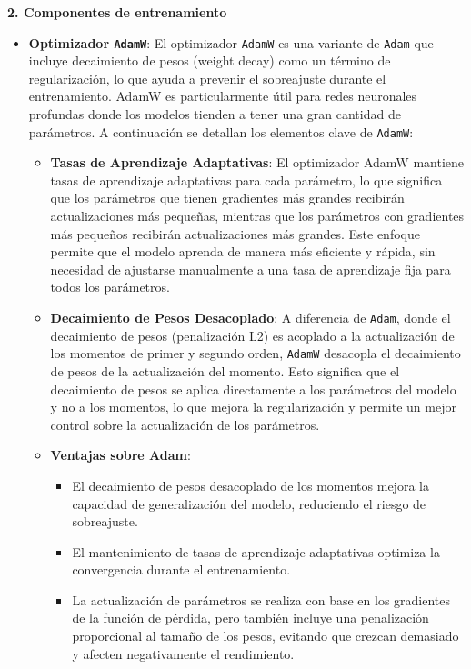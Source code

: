 \textbf{2. Componentes de entrenamiento}
\begin{itemize}
    \item \textbf{Optimizador \texttt{AdamW}}:
    El optimizador \texttt{AdamW} es una variante de \texttt{Adam} que incluye decaimiento de pesos (weight decay) como un término de regularización, lo que ayuda a prevenir el sobreajuste durante el entrenamiento. AdamW es particularmente útil para redes neuronales profundas donde los modelos tienden a tener una gran cantidad de parámetros. A continuación se detallan los elementos clave de \texttt{AdamW}:
    
    \begin{itemize}
        \item \textbf{Tasas de Aprendizaje Adaptativas}: 
        El optimizador AdamW mantiene tasas de aprendizaje adaptativas para cada parámetro, lo que significa que los parámetros que tienen gradientes más grandes recibirán actualizaciones más pequeñas, mientras que los parámetros con gradientes más pequeños recibirán actualizaciones más grandes. Este enfoque permite que el modelo aprenda de manera más eficiente y rápida, sin necesidad de ajustarse manualmente a una tasa de aprendizaje fija para todos los parámetros. 

        \item \textbf{Decaimiento de Pesos Desacoplado}: 
        A diferencia de \texttt{Adam}, donde el decaimiento de pesos (penalización L2) es acoplado a la actualización de los momentos de primer y segundo orden, \texttt{AdamW} desacopla el decaimiento de pesos de la actualización del momento. Esto significa que el decaimiento de pesos se aplica directamente a los parámetros del modelo y no a los momentos, lo que mejora la regularización y permite un mejor control sobre la actualización de los parámetros.

        \item \textbf{Ventajas sobre Adam}: 
        \begin{itemize}
            \item El decaimiento de pesos desacoplado de los momentos mejora la capacidad de generalización del modelo, reduciendo el riesgo de sobreajuste.
            \item El mantenimiento de tasas de aprendizaje adaptativas optimiza la convergencia durante el entrenamiento.
            \item La actualización de parámetros se realiza con base en los gradientes de la función de pérdida, pero también incluye una penalización proporcional al tamaño de los pesos, evitando que crezcan demasiado y afecten negativamente el rendimiento.
        \end{itemize}
        

\end{itemize}
\end{itemize}
